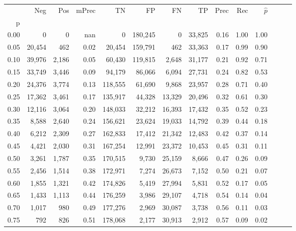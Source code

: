 \begin{tabular}{rrrrrrrrrrrrrr}
\toprule
{} &     Neg &    Pos & mPrec &       TN &       FP &      FN &      TP &  Prec &   Rec & $\hat{p}$ \\
p    &         &        &       &          &          &         &         &       &       &           \\
\midrule
0.00 &       0 &      0 &   nan &        0 &  180,245 &       0 &  33,825 &  0.16 &  1.00 &      1.00 \\
0.05 &  20,454 &    462 &  0.02 &   20,454 &  159,791 &     462 &  33,363 &  0.17 &  0.99 &      0.90 \\
0.10 &  39,976 &  2,186 &  0.05 &   60,430 &  119,815 &   2,648 &  31,177 &  0.21 &  0.92 &      0.71 \\
0.15 &  33,749 &  3,446 &  0.09 &   94,179 &   86,066 &   6,094 &  27,731 &  0.24 &  0.82 &      0.53 \\
0.20 &  24,376 &  3,774 &  0.13 &  118,555 &   61,690 &   9,868 &  23,957 &  0.28 &  0.71 &      0.40 \\
0.25 &  17,362 &  3,461 &  0.17 &  135,917 &   44,328 &  13,329 &  20,496 &  0.32 &  0.61 &      0.30 \\
0.30 &  12,116 &  3,064 &  0.20 &  148,033 &   32,212 &  16,393 &  17,432 &  0.35 &  0.52 &      0.23 \\
0.35 &   8,588 &  2,640 &  0.24 &  156,621 &   23,624 &  19,033 &  14,792 &  0.39 &  0.44 &      0.18 \\
0.40 &   6,212 &  2,309 &  0.27 &  162,833 &   17,412 &  21,342 &  12,483 &  0.42 &  0.37 &      0.14 \\
0.45 &   4,421 &  2,030 &  0.31 &  167,254 &   12,991 &  23,372 &  10,453 &  0.45 &  0.31 &      0.11 \\
0.50 &   3,261 &  1,787 &  0.35 &  170,515 &    9,730 &  25,159 &   8,666 &  0.47 &  0.26 &      0.09 \\
0.55 &   2,456 &  1,514 &  0.38 &  172,971 &    7,274 &  26,673 &   7,152 &  0.50 &  0.21 &      0.07 \\
0.60 &   1,855 &  1,321 &  0.42 &  174,826 &    5,419 &  27,994 &   5,831 &  0.52 &  0.17 &      0.05 \\
0.65 &   1,433 &  1,113 &  0.44 &  176,259 &    3,986 &  29,107 &   4,718 &  0.54 &  0.14 &      0.04 \\
0.70 &   1,017 &    980 &  0.49 &  177,276 &    2,969 &  30,087 &   3,738 &  0.56 &  0.11 &      0.03 \\
0.75 &     792 &    826 &  0.51 &  178,068 &    2,177 &  30,913 &   2,912 &  0.57 &  0.09 &      0.02 \\

\end{tabular}
